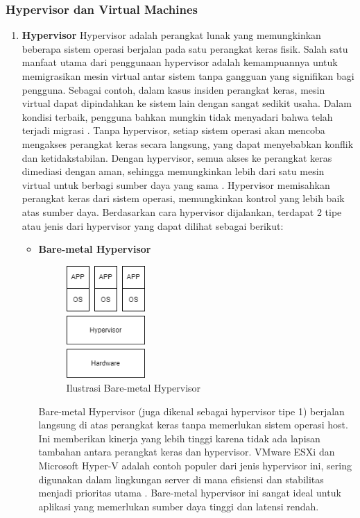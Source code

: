 \documentclass[12pt]{article}
\begin{document}
\subsubsection{Hypervisor dan Virtual Machines}
\begin{enumerate}
    \item \textbf{Hypervisor}
    \newline Hypervisor adalah perangkat lunak yang memungkinkan beberapa sistem operasi berjalan pada satu perangkat keras fisik. Salah satu manfaat utama dari penggunaan hypervisor adalah kemampuannya untuk memigrasikan mesin virtual antar sistem tanpa gangguan yang signifikan bagi pengguna. Sebagai contoh, dalam kasus insiden perangkat keras, mesin virtual dapat dipindahkan ke sistem lain dengan sangat sedikit usaha. Dalam kondisi terbaik, pengguna bahkan mungkin tidak menyadari bahwa telah terjadi migrasi \cite{satra2023}. Tanpa hypervisor, setiap sistem operasi akan mencoba mengakses perangkat keras secara langsung, yang dapat menyebabkan konflik dan ketidakstabilan. Dengan hypervisor, semua akses ke perangkat keras dimediasi dengan aman, sehingga memungkinkan lebih dari satu mesin virtual untuk berbagi sumber daya yang sama \cite{portnoy2012}. Hypervisor memisahkan perangkat keras dari sistem operasi, memungkinkan kontrol yang lebih baik atas sumber daya. Berdasarkan cara hypervisor dijalankan, terdapat 2 tipe atau jenis dari hypervisor yang dapat dilihat sebagai berikut:
    \begin{itemize}
        \item \textbf{Bare-metal Hypervisor}
        \begin{figure}[h]
            \centering
            \includegraphics[width=0.3\textwidth]{assets/hypervisor_tipe_1.png}
            \caption{Ilustrasi Bare-metal Hypervisor}
        \end{figure}
        Bare-metal Hypervisor (juga dikenal sebagai hypervisor tipe 1) berjalan langsung di atas perangkat keras tanpa memerlukan sistem operasi host. Ini memberikan kinerja yang lebih tinggi karena tidak ada lapisan tambahan antara perangkat keras dan hypervisor. VMware ESXi dan Microsoft Hyper-V adalah contoh populer dari jenis hypervisor ini, sering digunakan dalam lingkungan server di mana efisiensi dan stabilitas menjadi prioritas utama \cite{satra2023}. Bare-metal hypervisor ini sangat ideal untuk aplikasi yang memerlukan sumber daya tinggi dan latensi rendah.


\end{itemize}
\end{enumerate}
\end{document}
